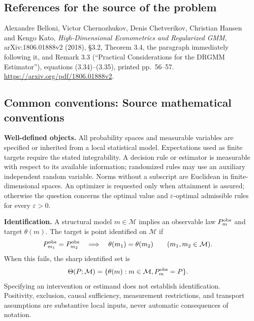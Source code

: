 \documentclass[11pt,a4paper]{article}
\begin{document}
\subsection*{References for the source of the problem}
Alexandre Belloni, Victor Chernozhukov, Denis Chetverikov, Christian
Hansen and Kengo Kato, \emph{High-Dimensional Econometrics and
Regularized GMM}, arXiv:1806.01888v2 (2018), \S3.2, Theorem 3.4,
the paragraph immediately following it, and Remark 3.3
(``Practical Considerations for the DRGMM Estimator''), equations
(3.34)--(3.35), printed pp.~56--57.
\url{https://arxiv.org/pdf/1806.01888v2}.

\subsection*{Common conventions: Source mathematical conventions}

\textbf{Well-defined objects.}
All probability spaces and measurable variables are specified or inherited
from a local statistical model. Expectations used as finite targets require
the stated integrability. A decision rule or estimator is measurable with
respect to its available information; randomized rules may use an auxiliary
independent random variable. Norms without a subscript are Euclidean in
finite-dimensional spaces. An optimizer is requested only when attainment
is assured; otherwise the question concerns the optimal value and
$\varepsilon$-optimal admissible rules for every $\varepsilon>0$.

\textbf{Identification.}
A structural model $m\in\mathcal M$ implies an observable law
$P_m^{\rm obs}$ and target $\theta(m)$. The target is point identified on
$\mathcal M$ if
\[
 P_{m_1}^{\rm obs}=P_{m_2}^{\rm obs}
 \quad\Longrightarrow\quad\theta(m_1)=\theta(m_2)
 \qquad(m_1,m_2\in\mathcal M).
\]
When this fails, the sharp identified set is
\[
 \Theta(P;\mathcal M)=\{\theta(m):m\in\mathcal M,
                                  P_m^{\rm obs}=P\}.
\]
Specifying an intervention or estimand does not establish identification.
Positivity, exclusion, causal sufficiency, measurement restrictions, and
transport assumptions are substantive local inputs, never automatic
consequences of notation.
\end{document}
